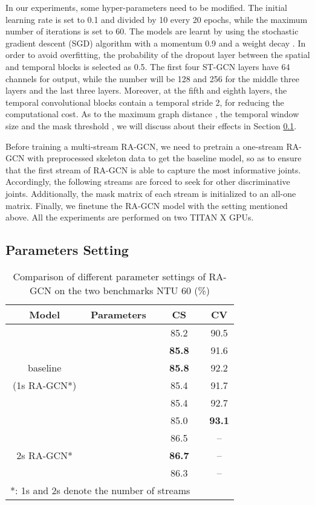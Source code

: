 \documentclass[journal]{IEEEtran}
\begin{document}
In our experiments, some hyper-parameters need to be modified. The initial learning rate is set to 0.1 and divided by 10 every 20 epochs, while the maximum number of iterations is set to 60. The models are learnt by using the stochastic gradient descent (SGD) algorithm with a momentum 0.9 and a weight decay . In order to avoid overfitting, the probability of the dropout layer between the spatial and temporal blocks is selected as 0.5. The first four ST-GCN layers have 64 channels for output, while the number will be 128 and 256 for the middle three layers and the last three layers. Moreover, at the fifth and eighth layers, the temporal convolutional blocks contain a temporal stride 2, for reducing the computational cost. As to the maximum graph distance , the temporal window size  and the mask threshold , we will discuss about their effects in Section \ref{ssec:parameters}.

Before training a multi-stream RA-GCN, we need to pretrain a one-stream RA-GCN with preprocessed skeleton data to get the baseline model, so as to ensure that the first stream of RA-GCN is able to capture the most informative joints. Accordingly, the following streams are forced to seek for other discriminative joints. Additionally, the mask matrix of each stream is initialized to an all-one matrix. Finally, we finetune the RA-GCN model with the setting mentioned above. All the experiments are performed on two TITAN X GPUs.

\subsection{Parameters Setting}
\label{ssec:parameters}

\begin{table}[t]
\caption{Comparison of different parameter settings of RA-GCN on the two benchmarks NTU 60 (\%)}
\label{tab:parameters}
\centering
\begin{tabular}{cccccc}
\hline
Model & Parameters & & CS &  & CV \\
\hline
&&  & 85.2 & & 90.5 \\
&&  & {\bf 85.8} & & 91.6 \\
baseline &&  & {\bf 85.8} & & 92.2 \\
(1s RA-GCN*) &&  & 85.4 & & 91.7 \\
&&  & 85.4 & & 92.7 \\
&&  & 85.0 & & {\bf 93.1} \\
\hline
& &  & 86.5 & & -- \\
2s RA-GCN*& &  & {\bf 86.7} & & -- \\
& &  & 86.3 & & -- \\
\hline
\multicolumn{4}{l}{*: 1s and 2s denote the number of streams}
\end{tabular}
\vspace{-0.4cm}
\end{table}
\end{document}
